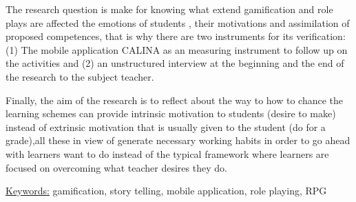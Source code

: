 \begin{singlespace}
The research question is make for knowing what extend gamification and role plays are affected the emotions
of students \cite{MULLINS2020304}, their motivations and assimilation of proposed competences, that is
why there are two instruments for its verification: (1) The mobile application CALINA as an measuring
instrument to follow up on the activities and (2) an unstructured interview at the beginning and the end of
the research to the subject teacher.

Finally, the aim of the research is to reflect about the way to how to chance the learning schemes can provide 
intrinsic motivation to students (desire to make) instead of extrinsic motivation that is usually given to the 
student (do for a grade),all these in view of generate necessary working habits in order to go ahead with 
learners want to do instead of the typical framework where learners are focused on overcoming what teacher 
desires they do.
\end{singlespace}

\uline{Keywords:} gamification, story telling, mobile application, role playing, RPG

